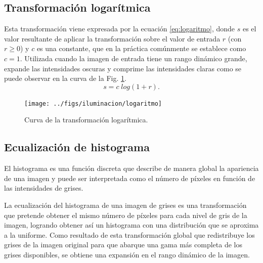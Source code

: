 \subsection{Transformación logarítmica}
\label{subsec:transf_logaritmica}
Esta transformación viene expresada por la ecuación \eqref{eq:logaritmo}, donde $s$ es el valor resultante de aplicar la transformación sobre el valor de entrada $r$ (con $r \geq 0$) y $c$ es una constante, que en la práctica comúnmente se establece como $c=1$. Utilizada cuando la imagen de entrada tiene un rango dinámico grande, expande las intensidades oscuras y comprime las intensidades claras como se puede observar en la curva de la Fig. \ref{fig:log_curve}.
\begin{equation}
    s=c\;log(1+r).
    \label{eq:logaritmo}
\end{equation}
\begin{figure}[tbhp]
   \centering
        \texttt{[image: ../figs/iluminacion/logaritmo]}
    \caption[Curva de la transformación logarítmica]{Curva de la transformación logarítmica.}
   \label{fig:log_curve}                %
\end{figure}
\subsection{Ecualización de histograma}
\label{subsec:iluminacion_ecualizacion}
El histograma es una función discreta que describe de manera global la apariencia de una imagen y puede ser interpretada como el número de píxeles en función de las intensidades de grises.

La ecualización del histograma de una imagen de grises es una transformación que pretende obtener el mismo número de píxeles para cada nivel de gris de la imagen, logrando obtener así un histograma con una distribución que se aproxima a la uniforme. Como resultado de esta transformación global que redistribuye los grises de la imagen original para que abarque una gama más completa de los grises disponibles, se obtiene una expansión en el rango dinámico de la imagen.

